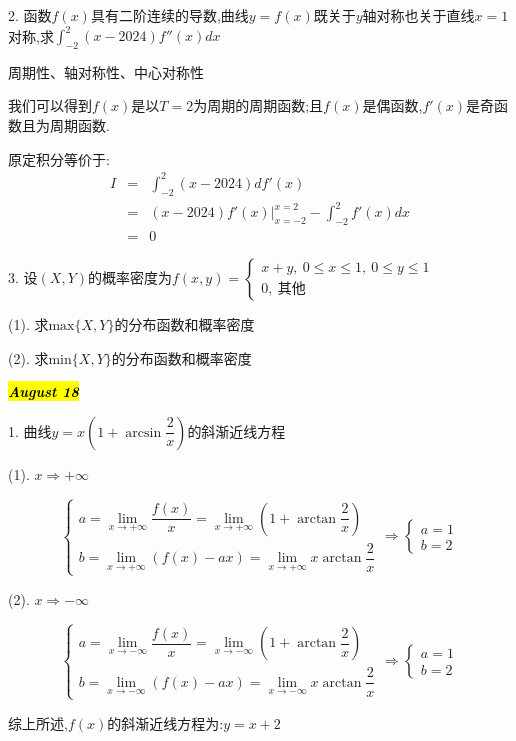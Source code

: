 2. 函数$f(x)$具有二阶连续的导数,曲线$y=f(x)$既关于$y$轴对称也关于直线$x=1$对称,求$\int_{-2}^{2}(x-2024)f''(x)dx$
\begin{solution}

	周期性、轴对称性、中心对称性
	
	我们可以得到$f(x)$是以$T=2$为周期的周期函数;且$f(x)$是偶函数,$f'(x)$是奇函数且为周期函数.
	
	原定积分等价于:  
	\begin{eqnarray*}
		I&=&\int_{-2}^{2}(x-2024)df'(x)\\
		&=&(x-2024)f'(x)|_{x=-2}^{x=2}-\int_{-2}^{2}f'(x)dx\\
		&=&0
	\end{eqnarray*}
\end{solution}

3. 设$(X,Y)$的概率密度为$f(x,y)=\left\lbrace
\begin{array}{l}
	x+y,\ 0\leq x\leq 1,\ 0\leq y\leq 1\\
	0,\ \text{其他}
\end{array}
\right. $

(1). 求$\text{max}\{X,Y\}$的分布函数和概率密度

(2). 求$\text{min}\{X,Y\}$的分布函数和概率密度
\begin{solution}
	
\end{solution}

\hl{\textbf{\textit{August 18}}}

1. 曲线$y=x(1+\arcsin \dfrac{2}{x})$的斜渐近线方程
\begin{solution}

	(1). $x\Rightarrow +\infty$
	
	$$\left\lbrace
	\begin{array}{l}
		a=\lim\limits_{x\rightarrow+\infty}\dfrac{f(x)}{x}=\lim\limits_{x\rightarrow+\infty}(1+\arctan\dfrac{2}{x})\\
		b=\lim\limits_{x\rightarrow+\infty}(f(x)-ax)=\lim\limits_{x\rightarrow+\infty}x\arctan\dfrac{2}{x}
	\end{array}
	\right. \Rightarrow \left\lbrace
	\begin{array}{l}
		a=1\\
		b=2
	\end{array}
	\right. $$
	
	(2). $x\Rightarrow -\infty$
	
	$$\left\lbrace
	\begin{array}{l}
		a=\lim\limits_{x\rightarrow-\infty}\dfrac{f(x)}{x}=\lim\limits_{x\rightarrow -\infty}(1+\arctan\dfrac{2}{x})\\
		b=\lim\limits_{x\rightarrow-\infty}(f(x)-ax)=\lim\limits_{x\rightarrow-\infty}x\arctan\dfrac{2}{x}
	\end{array}
	\right. \Rightarrow \left\lbrace
	\begin{array}{l}
		a=1\\
		b=2
	\end{array}
	\right. $$
	
	综上所述,$f(x)$的斜渐近线方程为:$y=x+2$
\end{solution}

